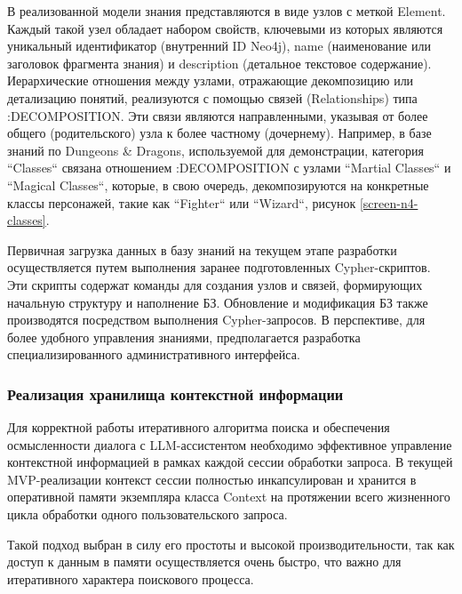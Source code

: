 
В реализованной модели знания представляются в виде узлов с меткой Element. Каждый такой узел обладает набором свойств, ключевыми из которых являются уникальный идентификатор (внутренний ID Neo4j), name (наименование или заголовок фрагмента знания) и description (детальное текстовое содержание). Иерархические отношения между узлами, отражающие декомпозицию или детализацию понятий, реализуются с помощью связей (Relationships) типа :DECOMPOSITION. Эти связи являются направленными, указывая от более общего (родительского) узла к более частному (дочернему). Например, в базе знаний по Dungeons & Dragons, используемой для демонстрации, категория ``Classes`` связана отношением :DECOMPOSITION с узлами ``Martial Classes`` и ``Magical Classes``, которые, в свою очередь, декомпозируются на конкретные классы персонажей, такие как ``Fighter`` или ``Wizard``, рисунок \ref{screen-n4-classes}.

Первичная загрузка данных в базу знаний на текущем этапе разработки осуществляется путем выполнения заранее подготовленных Cypher-скриптов. Эти скрипты содержат команды для создания узлов и связей, формирующих начальную структуру и наполнение БЗ. Обновление и модификация БЗ также производятся посредством выполнения Cypher-запросов. В перспективе, для более удобного управления знаниями, предполагается разработка специализированного административного интерфейса.

\subsubsection{Реализация хранилища контекстной информации}

Для корректной работы итеративного алгоритма поиска и обеспечения осмысленности диалога с LLM-ассистентом необходимо эффективное управление контекстной информацией в рамках каждой сессии обработки запроса. В текущей MVP-реализации контекст сессии полностью инкапсулирован и хранится в оперативной памяти экземпляра класса Context на протяжении всего жизненного цикла обработки одного пользовательского запроса.

Такой подход выбран в силу его простоты и высокой производительности, так как доступ к данным в памяти осуществляется очень быстро, что важно для итеративного характера поискового процесса.

